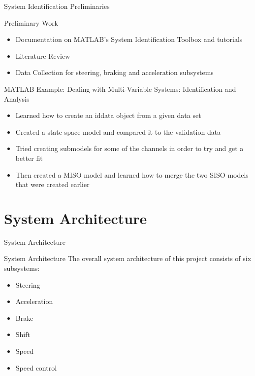 \documentclass{beamer}
\begin{document}
\begin{frame}{System Identification Preliminaries}{}
  \begin{block}{Preliminary Work}
 \begin{itemize}
        \item Documentation on MATLAB's System Identification Toolbox and tutorials
        \item Literature Review 
        \item Data Collection for steering, braking and acceleration subsystems
\end{itemize}
  \end{block}
  
   \begin {block}{MATLAB Example: Dealing with Multi-Variable Systems: Identification and Analysis}
  \begin{itemize}
  	\item  Learned how to create an iddata object from a given data set 
  	\item Created a state space model and compared it to the validation data 
  	\item Tried creating submodels for some of the channels in order to try and get a better fit 
  	\item Then created a MISO model and learned how to merge the two SISO models that were created earlier 
  	\end{itemize}
  	\end{block}
\end{frame}

\section{System Architecture}

\begin{frame}{System Architecture}{}
	\begin{block}{System Architecture}
    The overall system architecture of this project consists of six subsystems: 
    \begin{itemize}
        \item Steering
        \item Acceleration
        \item Brake %
        \item Shift %
        \item Speed %
        \item Speed control %
      \end{itemize} 
  \end{block}
\end{frame}
\end{document}

